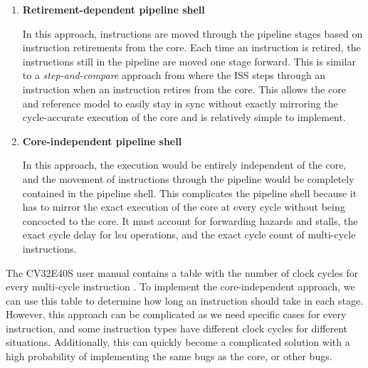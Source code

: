 \begin{enumerate}
    \item \textbf{Retirement-dependent pipeline shell}
    \par In this approach, instructions are moved through the pipeline stages based on instruction retirements from the core. Each time an instruction is retired, the instructions still in the pipeline are moved one stage forward. This is similar to a \textit{step-and-compare} approach from  where the ISS steps through an instruction when an instruction retires from the core. This allows the core and reference model to easily stay in sync without exactly mirroring the cycle-accurate execution of the core and is relatively simple to implement.

    \item \textbf{Core-independent pipeline shell}
    \par In this approach, the execution would be entirely independent of the core, and the movement of instructions through the pipeline would be completely contained in the pipeline shell. This complicates the pipeline shell because it has to mirror the exact execution of the core at every cycle without being concocted to the core. It must account for forwarding hazards and stalls, the exact cycle delay for \acrshort{lsu} operations, and the exact cycle count of multi-cycle instructions.
    



\end{enumerate}

The CV32E40S user manual contains a table with the number of clock cycles for every multi-cycle instruction \cite{openhwgroupPipelineDetailsCOREV2023}. To implement the core-independent approach, we can use this table to determine how long an instruction should take in each stage. However, this approach can be complicated as we need specific cases for every instruction, and some instruction types have different clock cycles for different situations. Additionally, this can quickly become a complicated solution with a high probability of implementing the same bugs as the core, or other bugs.

